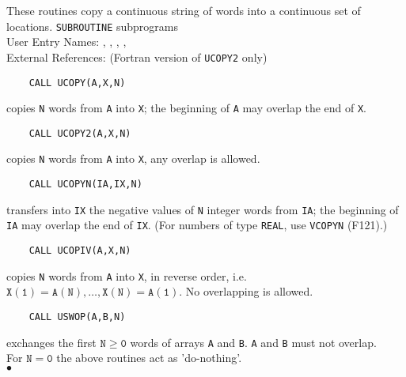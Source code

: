                         
       
\Submitter{}                            
   
These routines copy a continuous string of words into a
continuous set of locations.
\Structure
{\tt SUBROUTINE} subprograms \\
User Entry Names: , , ,
,  \\
External References:  (Fortran version of {\tt UCOPY2}
only)
\Usage
\begin{verbatim}
    CALL UCOPY(A,X,N)
\end{verbatim}
copies {\tt N} words from {\tt A} into {\tt X};
the beginning of {\tt A} may overlap the end of {\tt X}.
\begin{verbatim}
    CALL UCOPY2(A,X,N)
\end{verbatim}
copies {\tt N} words from {\tt A} into {\tt X},
any overlap is allowed.
\begin{verbatim}
    CALL UCOPYN(IA,IX,N)
\end{verbatim}
transfers into {\tt IX} the negative values of {\tt N} integer words
from {\tt IA};
the beginning of {\tt IA} may overlap the end of {\tt IX}.
(For numbers of type {\tt REAL}, use {\tt VCOPYN} (F121).)
\begin{verbatim}
    CALL UCOPIV(A,X,N)
\end{verbatim}
copies {\tt N} words from {\tt A} into {\tt X}, in reverse order,
i.e. $\mathtt{X(1)=A(N),\ldots,X(N)=A(1)}$. No overlapping is allowed.
\begin{verbatim}
    CALL USWOP(A,B,N)
\end{verbatim}
exchanges the first $\mathtt{N \geq 0}$ words of arrays {\tt A} and
{\tt B}. {\tt A} and {\tt B} must not overlap. \\[4mm]
For $\mathtt{N=0}$ the above routines act as 'do-nothing'.
\\ $\bullet$

